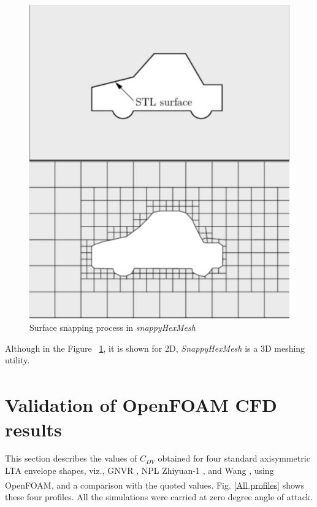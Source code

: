 \begin{figure}[htbp]
	\centering
	\includegraphics[width=200 pt]{mesh/snappyHexMesh.png}
	\caption{Surface snapping process in \textit{snappyHexMesh} }
	\label{Snappy Hex Mesh} %
\end{figure} 

Although in the Figure ~\ref{Snappy Hex Mesh}, it is shown for 2D, \textit{SnappyHexMesh} is a 3D meshing utility.

\section{Validation of OpenFOAM\textsuperscript{\textregistered} CFD results}
\label{results}

This section describes the values of $C_{DV}$ obtained for four standard axisymmetric LTA envelope shapes, viz., GNVR \cite{Ram}, NPL \cite{cheeseman2012} Zhiyuan-1 \cite{zhiyuan}, and Wang \cite{Wangshape}, using OpenFOAM\textsuperscript{\textregistered}, and a comparison with the quoted values. 
Fig. \ref{All profiles} shows these four profiles. All the simulations were carried at zero degree angle of attack.

